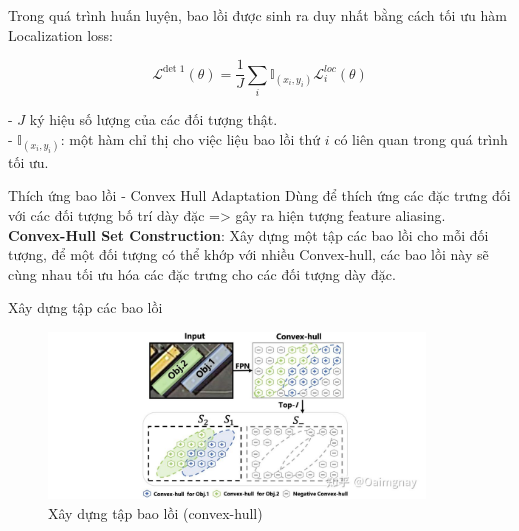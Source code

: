 \documentclass[11pt]{beamer}
\theoremstyle{definition}
\theoremstyle{plain}
\theoremstyle{plain}
\theoremstyle{remark}
\begin{document}
	\begin{frame}
		Trong quá trình huấn luyện, bao lồi được sinh ra duy nhất bằng cách tối ưu hàm Localization loss:
		
		\begin{equation}
			\mathcal{L}^{\text {det } 1}(\theta)=\frac{1}{J} \sum_i \mathbb{I}_{\left(x_i, y_i\right)} \mathcal{L}_i^{l o c}(\theta)
		\end{equation}
		
		- $J$ ký hiệu số lượng của các đối tượng thật. \\
		-  $\mathbb{I}_{\left(x_i, y_i\right)}$: một hàm chỉ thị cho việc liệu bao lồi thứ $i$ có liên quan trong quá trình tối ưu.
	\end{frame}
	\begin{frame}{Thích ứng bao lồi - Convex Hull Adaptation}
		Dùng để thích ứng các đặc trưng đối với các đối tượng bố trí dày đặc => gây ra hiện tượng feature aliasing. \\
		\textbf{Convex-Hull Set Construction}: Xây dựng một tập các bao lồi cho mỗi đối tượng,
		để một đối tượng có thể khớp với nhiều Convex-hull, các bao lồi này sẽ cùng nhau tối ưu hóa các đặc trưng cho các đối tượng dày đặc.
	\end{frame}
	
	\begin{frame}{Xây dựng tập các bao lồi}
		\begin{figure}[ht!]
			\begin{center}
				\includegraphics[width=10cm]{./Hinh_8.jpg}
				\caption{Xây dựng tập bao lồi (convex-hull)}
				\label{fig_dhandang8 }
			\end{center}
		\end{figure}
		
	\end{frame}
	
\end{document}
